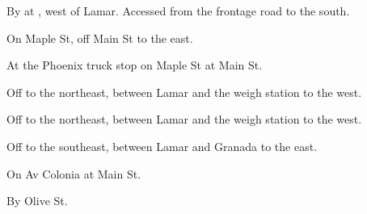 

\begin{LocationList}

By  at , west of Lamar. Accessed from the frontage road to the south.

On Maple St, off   Main St to the east.

At the Phoenix truck stop on Maple St at   Main St.

\Location{\GarageHQ \Garage}
Off   to the northeast, between Lamar and the weigh station to the west.

Off   to the northeast, between Lamar and the weigh station to the west.

Off   to the southeast, between Lamar and Granada to the east.

\Location{\TruckStop \Gas \Rest \Weigh}
On Av Colonia at   Main St.

By   Olive St.

\end{LocationList}
